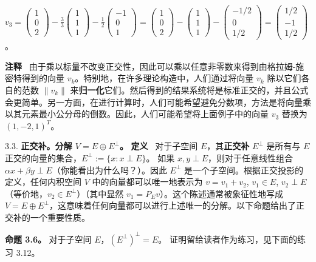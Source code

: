 $v_3 = \begin{pmatrix} 1 \\ 0 \\ 2 \end{pmatrix} - \frac{3}{3} \begin{pmatrix} 1 \\ 1 \\ 1 \end{pmatrix} - \frac{1}{2} \begin{pmatrix} -1 \\ 0 \\ 1 \end{pmatrix} = \begin{pmatrix} 1 \\ 0 \\ 2 \end{pmatrix} - \begin{pmatrix} 1 \\ 1 \\ 1 \end{pmatrix} - \begin{pmatrix} -1/2 \\ 0 \\ 1/2 \end{pmatrix} = \begin{pmatrix} 1/2 \\ -1 \\ 1/2 \end{pmatrix}$。

\textbf{注释} ~由于乘以标量不改变正交性，因此可以乘以任意非零数来得到由格拉姆-施密特得到的向量 $v_k$。特别地，在许多理论构造中，人们通过将向量 $v_k$ 除以它们各自的范数 $\|v_k\|$ 来\textbf{归一化}它们。然后得到的结果系统将是标准正交的，并且公式会更简单。另一方面，在进行计算时，人们可能希望避免分数项，方法是将向量乘以其元素最小公分母的倒数。因此，人们可能希望将上面例子中的向量 $v_3$ 替换为 $(1, -2, 1)^T$。

3.3. \textbf{正交补。分解 $V = E \oplus E^\perp$。}
\textbf{定义}~ 对于子空间 $E$，其\textbf{正交补} $E^\perp$ 是所有与 $E$ 正交的向量的集合，$E^\perp := \{x : x \perp E\}$。
如果 $x, y \perp E$，则对于任意线性组合 $\alpha x + \beta y \perp E$（你能看出为什么吗？）。因此 $E^\perp$ 是一个子空间。根据正交投影的定义，任何内积空间 $V$ 中的向量都可以唯一地表示为 $v = v_1 + v_2$, $v_1 \in E$, $v_2 \perp E$（等价地，$v_2 \in E^\perp$）（其中显然 $v_1 = P_E v$）。这个陈述通常被象征性地写成 $V = E \oplus E^\perp$，这意味着任何向量都可以进行上述唯一的分解。以下命题给出了正交补的一个重要性质。

\textbf{命题 3.6。} 对于子空间 $E$，$(E^\perp)^\perp = E$。
证明留给读者作为练习，见下面的练习 3.12。

